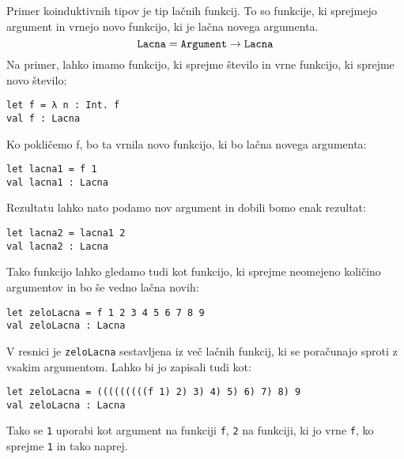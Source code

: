 \documentclass[12pt,a4paper,openany]{book}
\begin{document}
Primer koinduktivnih tipov je tip lačnih funkcij. To so funkcije, ki sprejmejo argument in vrnejo novo funkcijo, ki je lačna novega argumenta.
\begin{equation}
    \mathtt{Lacna} = \mathtt{Argument} \rightarrow \mathtt{Lacna} \notag
\end{equation}
Na primer, lahko imamo funkcijo, ki sprejme število in vrne funkcijo, ki sprejme novo število:
\begin{lstlisting}
let f = λ n : Int. f
val f : Lacna  
\end{lstlisting}
Ko pokličemo f, bo ta vrnila novo funkcijo, ki bo lačna novega argumenta:
\begin{lstlisting}
let lacna1 = f 1
val lacna1 : Lacna
\end{lstlisting}
Rezultatu lahko nato podamo nov argument in dobili bomo enak rezultat:
\begin{lstlisting}
let lacna2 = lacna1 2
val lacna2 : Lacna  
\end{lstlisting}
Tako funkcijo lahko gledamo tudi kot funkcijo, ki sprejme neomejeno količino argumentov in bo še vedno lačna novih:
\begin{lstlisting}
let zeloLacna = f 1 2 3 4 5 6 7 8 9
val zeloLacna : Lacna
\end{lstlisting}
V resnici je \lstinline{zeloLacna} sestavljena iz več lačnih funkcij, ki se poračunajo sproti z vsakim argumentom. Lahko bi jo zapisali tudi kot:
\begin{lstlisting}
let zeloLacna = (((((((((f 1) 2) 3) 4) 5) 6) 7) 8) 9
val zeloLacna : Lacna
\end{lstlisting}
Tako se \lstinline{1} uporabi kot argument na funkciji \lstinline{f}, \lstinline{2} na funkciji, ki jo vrne \lstinline{f}, ko sprejme \lstinline{1} in tako naprej.
\end{document}
